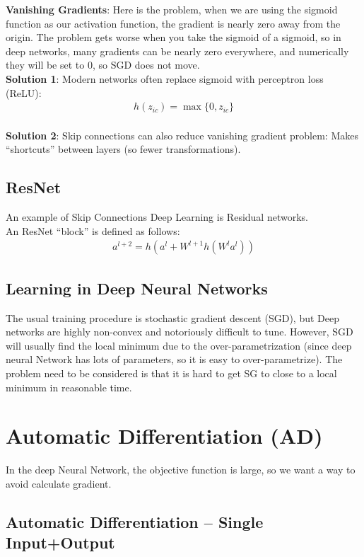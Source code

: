 \textbf{Vanishing Gradients}:  Here is the problem, when we are using the sigmoid function as our activation function, the gradient is nearly zero away from the origin. The problem gets worse when you take the sigmoid of a sigmoid, so in deep networks, many gradients can be nearly zero everywhere, and numerically they will be set to 0, so SGD does not move.
\\ \textbf{Solution 1}: Modern networks often replace sigmoid with perceptron loss (ReLU):
\begin{align*}
    h(z_{ic}) = \max_{}\{ 0, z_{ic}\}
\end{align*}
\\ \textbf{Solution 2}: Skip connections can also reduce vanishing gradient problem: Makes “shortcuts” between layers (so fewer transformations).

\subsection{ResNet} \label{sec:}
An example of Skip Connections Deep Learning is Residual networks. 
\\ An ResNet ``block'' is defined as follows:
\begin{align*}
    a^{l+2} = h(a^{l} + W^{l+1} h(W^{l}a^{l}))
\end{align*}

\subsection{Learning in Deep Neural Networks} \label{sec:}
The usual training procedure is stochastic gradient descent (SGD), but Deep networks are highly non-convex and notoriously difficult to tune. However, SGD will usually find the local minimum due to the over-parametrization (since deep neural Network has lots of parameters, so it is easy to over-parametrize). The problem need to be considered is that it is hard to get SG to close to a local minimum in reasonable time.

\section{Automatic Differentiation (AD)} \label{sec:}
In the deep Neural Network, the objective function is large, so we want a way to avoid calculate gradient.

\subsection{Automatic Differentiation – Single Input+Output} \label{sec:}

